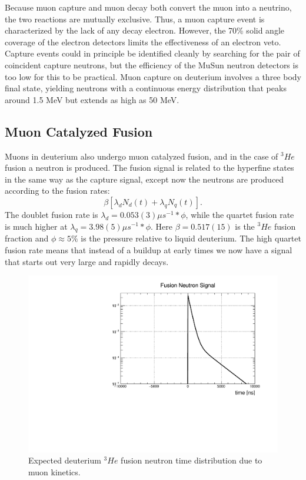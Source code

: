 Because muon capture and muon decay both convert the muon into a neutrino, the two reactions are mutually exclusive.  
Thus, a muon capture event is characterized by the lack of any decay electron. 
However, the 70\% solid angle coverage of the electron detectors limits the effectiveness of an electron veto.
Capture events could in principle be identified cleanly by searching for the pair of coincident capture neutrons, but the efficiency of the MuSun neutron detectors is too low for this to be practical.
Muon capture on deuterium involves a three body final state, yielding neutrons with a continuous energy distribution that peaks around 1.5 MeV but extends as high as 50 MeV. 

\subsection{Muon Catalyzed Fusion}

Muons in deuterium also undergo muon catalyzed fusion, and in the case of $^3He$ fusion a neutron is produced.  
The fusion signal is related to the hyperfine states in the same way as the capture signal, except now the neutrons are produced according to the fusion rates:
\begin{equation}
\beta[\lambda_d N_d(t) + \lambda_q N_q(t)].
\end{equation}
The doublet fusion rate is $\lambda_d = 0.053(3) \mu s^{-1} * \phi$, while the quartet fusion rate is much higher at $\lambda_q = 3.98(5) \mu s^{-1} * \phi$.
Here $\beta = 0.517(15)$ is the $^3He$ fusion fraction and $\phi \approx 5\%$ is the pressure relative to liquid deuterium.
The high quartet fusion rate means that instead of a buildup at early times we now have a signal that starts out very large and rapidly decays.

\begin{figure}[h]
  \includegraphics[width=\textwidth]{neutrons/figures/shape_fusion.pdf}
  \caption{Expected deuterium $^3He$ fusion neutron time distribution due to muon kinetics.}
  \label{fig:shape_fusion}
\end{figure}

